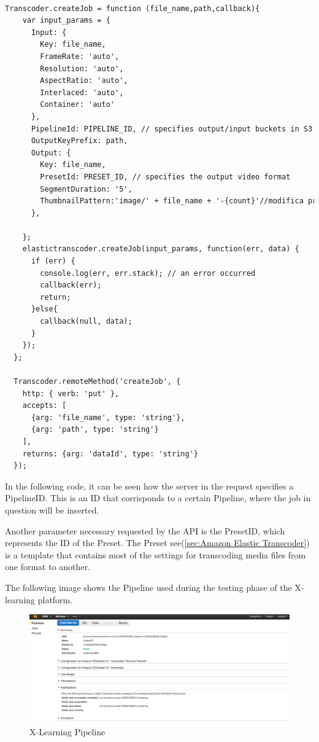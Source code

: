 \begin{lstlisting}[language=html]
  
Transcoder.createJob = function (file_name,path,callback){
    var input_params = {
      Input: { 
        Key: file_name, 
        FrameRate: 'auto', 
        Resolution: 'auto', 
        AspectRatio: 'auto', 
        Interlaced: 'auto', 
        Container: 'auto' 
      }, 
      PipelineId: PIPELINE_ID, // specifies output/input buckets in S3 
      OutputKeyPrefix: path,
      Output: { 
        Key: file_name, 
        PresetId: PRESET_ID, // specifies the output video format
        SegmentDuration: '5',
        ThumbnailPattern:'image/' + file_name + '-{count}'//modifica preset per determinare il numero di immagini
      },

    };    
    elastictranscoder.createJob(input_params, function(err, data) {
      if (err) {
        console.log(err, err.stack); // an error occurred
        callback(err);
        return;
      }else{
        callback(null, data);
      }
    });
  };
  
  Transcoder.remoteMethod('createJob', {
    http: { verb: 'put' },
    accepts: [
      {arg: 'file_name', type: 'string'},
      {arg: 'path', type: 'string'}
    ],
    returns: {arg: 'dataId', type: 'string'}
  });
\end{lstlisting}

In the following code, it can be seen how the server in the request specifies a PipelineID. This is an ID that corrisponds to a certain Pipeline, where the job in question will be inserted.

Another parameter necessary requested by the API is the PresetID, which represents the ID of the Preset. The Preset see(\ref{sec:Amazon Elastic Transcoder}) is a template that contains most of the settings for transcoding media files from one format to another.

The following image shows the Pipeline used during the testing phase of the X-learning platform.


\begin{figure}[htb]
 \centering
 \includegraphics[width=1.0\linewidth]{images/chapter5/elastic_pipeline.png}\hfill
 \caption [X-Learning Pipeline]{X-Learning Pipeline}
 \label{fig:fourV}
\end{figure}

